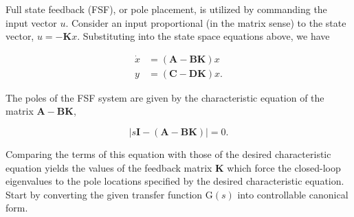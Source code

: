 \documentclass[main.tex]{subfiles}
\begin{document}
\begin{enumerate}
\begin{enumerate}
        Full state feedback (FSF), or pole placement, is utilized by commanding the input vector $u$. Consider an input proportional (in the matrix sense) to the state vector, $u=-\mathbf{K} x$. Substituting into the state space equations above, we have
        
        $$
        \begin{aligned}
        \dot{x} &= (\mathbf{A}-\mathbf{B K}) x \\
        {y} &= (\mathbf{C}-\mathbf{D K}) x.
        \end{aligned}
        $$
        
        The poles of the FSF system are given by the characteristic equation of the matrix $\mathbf{A}-\mathbf{B K}$,

        $$
        |s \mathbf{I}-(\mathbf{A}-\mathbf{B K})|=0.
        $$
        
        Comparing the terms of this equation with those of the desired characteristic equation yields the values of the feedback matrix $\mathbf{K}$ which force the closed-loop eigenvalues to the pole locations specified by the desired characteristic equation. Start by converting the given transfer function $\mathrm{G}(s)$ into controllable canonical form.
        

\end{enumerate}
\end{enumerate}
\end{document}
